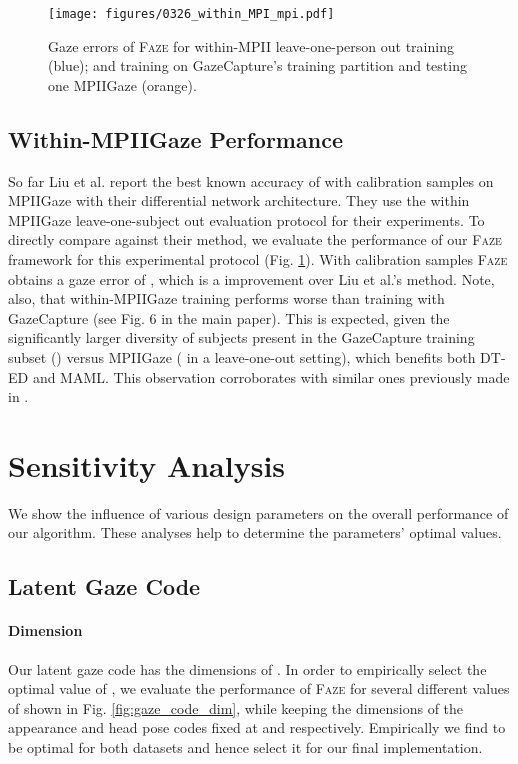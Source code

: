 \documentclass[10pt,twocolumn,letterpaper]{article}
\newcommand{\faze}[0]{\textsc{Faze}\xspace}
\begin{document}
\begin{figure}
    \centering
    \texttt{[image: figures/0326\_within\_MPI\_mpi.pdf]}
    \caption{Gaze errors of \faze for within-MPII leave-one-person out training (blue); and training on GazeCapture's training partition and testing one MPIIGaze (orange).}
    \label{fig:within_mpi}
\end{figure}

\subsection{Within-MPIIGaze Performance}


\noindent
So far Liu et al. \cite{Liu2018BMVC} report the best known accuracy of  with  calibration samples on MPIIGaze with their differential network architecture. They use the within MPIIGaze leave-one-subject out evaluation protocol for their experiments. To directly compare against their method, we evaluate the performance of our \faze framework for this experimental protocol (Fig. \ref{fig:within_mpi}). With  calibration samples \faze obtains a gaze error of , which is a  improvement over Liu et al.'s method. Note, also, that within-MPIIGaze training performs worse than training with GazeCapture (see Fig. 6 in the main paper). This is expected, given the significantly larger diversity of subjects present in the GazeCapture training subset () versus MPIIGaze ( in a leave-one-out setting), which benefits both DT-ED and MAML. This observation corroborates with similar ones previously made in \cite{Krafka2016CVPR}.


\section{Sensitivity Analysis}
\noindent
We show the influence of various design parameters on the overall performance of our algorithm. These analyses help to determine the parameters' optimal values. 

\subsection{Latent Gaze Code}

\paragraph{Dimension}

Our latent gaze code has the dimensions of . In order to empirically select the optimal value of , we evaluate the performance of \faze for several different values of  shown in Fig. \ref{fig:gaze_code_dim}, while keeping the dimensions of the appearance and head pose codes fixed at  and  respectively. Empirically we find  to be optimal for both datasets and hence select it for our final implementation.
\end{document}
